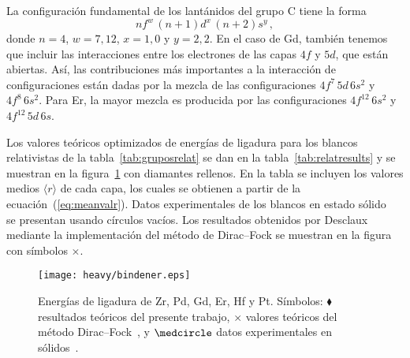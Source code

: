 La configuración fundamental de los lantánidos del grupo C tiene la 
forma 
\begin{equation}
nf^w\,(n+1)d^x\,(n+2)s^y\,,
\end{equation}
donde $n=4$, $w=7,12$, $x=1,0$ y $y=2,2$. En el caso de Gd, también 
tenemos que incluir las interacciones entre los electrones de las capas
$4f$ y $5d$, que están abiertas. Así, las contribuciones más 
importantes a la interacción de configuraciones están dadas por la 
mezcla de las configuraciones $4f^7\,5d\,6s^2$ y $4f^8\,6s^2$.
Para Er, la mayor mezcla es producida por las configuraciones 
$4f^{12}\,6s^2$ y $4f^{12}\,5d\,6s$.

Los valores teóricos optimizados de energías de ligadura para los 
blancos relativistas de la tabla~\ref{tab:gruposrelat} se dan en la 
tabla~\ref{tab:relatresults} y se muestran en la 
figura~\ref{fig:bindener} con diamantes rellenos. 
En la tabla se incluyen los valores medios $\langle r\rangle$ de cada 
capa, los cuales se obtienen a partir de la ecuación~(\ref{eq:meanvalr}). 
Datos experimentales de los blancos en estado sólido~\cite{Williams:95}
se presentan usando círculos vacíos. Los resultados obtenidos por 
Desclaux~\cite{Desclaux:73} mediante la implementación del método 
de Dirac--Fock se muestran en la figura con símbolos $\times$.

\begin{figure}[t]
\centering
\texttt{[image: heavy/bindener.eps]}
\caption[Energías de ligadura de blancos relativistas]
{Energías de ligadura de Zr, Pd, Gd, Er, Hf y Pt. Símbolos: 
$\blacklozenge$ resultados teóricos del presente trabajo, 
$\times$ valores teóricos del método Dirac--Fock~\cite{Desclaux:73}, y 
$\medcircle$ datos experimentales en sólidos~\cite{Williams:95}.}
\label{fig:bindener}
\end{figure}


